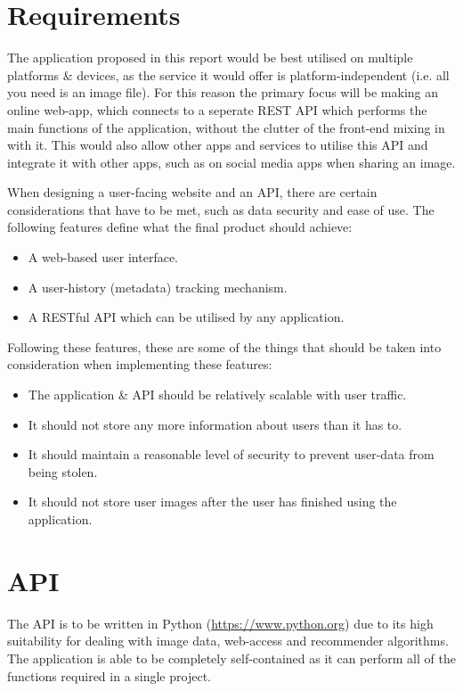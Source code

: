 \documentclass[a4paper,12pt]{report}
\begin{document}
  \section{Requirements} \label{sec:requirements}
    The application proposed in this report would be best utilised on multiple platforms \& devices, as the service it would offer is platform-independent (i.e. all you need is an image file). For this reason the primary focus will be making an online web-app, which connects to a seperate REST \citep{fielding2000architectural} API which performs the main functions of the application, without the clutter of the front-end mixing in with it. This would also allow other apps and services to utilise this API and integrate it with other apps, such as on social media apps when sharing an image.

    When designing a user-facing website and an API, there are certain considerations that have to be met, such as data security and ease of use. The following features define what the final product should achieve:

    \begin{itemize}
      \item A web-based user interface.
      \item A user-history (metadata) tracking mechanism.
      \item A RESTful API which can be utilised by any application.
    \end{itemize}

    Following these features, these are some of the things that should be taken into consideration when implementing these features:

      \begin{itemize}
        \item The application \& API should be relatively scalable with user traffic.
        \item It should not store any more information about users than it has to.
        \item It should maintain a reasonable level of security to prevent user-data from being stolen.
        \item It should not store user images after the user has finished using the application.
      \end{itemize}

    \section{API}
      The API is to be written in Python (\url{https://www.python.org}) due to its high suitability for dealing with image data, web-access and recommender algorithms. The application is able to be completely self-contained as it can perform all of the functions required in a single project.
\end{document}
